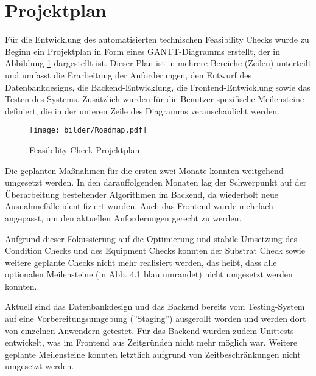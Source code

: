 \section{Projektplan}
Für die Entwicklung des automatisierten technischen Feasibility Checks wurde zu Beginn ein Projektplan in Form eines GANTT-Diagramms erstellt, der in Abbildung \ref{fig:roadmap} dargestellt ist. Dieser Plan ist in mehrere Bereiche (Zeilen) unterteilt und umfasst die Erarbeitung der Anforderungen, den Entwurf des Datenbankdesigns, die Backend-Entwicklung, die Frontend-Entwicklung sowie das Testen des Systems. Zusätzlich wurden für die Benutzer spezifische Meilensteine definiert, die in der unteren Zeile des Diagramms veranschaulicht werden.

\begin{figure}[!htbp]
    \centering
    \texttt{[image: bilder/Roadmap.pdf]}
    \caption{Feasibility Check Projektplan}
    \label{fig:roadmap}
\end{figure}

Die geplanten Maßnahmen für die ersten zwei Monate konnten weitgehend umgesetzt werden. In den darauffolgenden Monaten lag der Schwerpunkt auf der Überarbeitung bestehender Algorithmen im Backend, da wiederholt neue Ausnahmefälle identifiziert wurden. Auch das Frontend wurde mehrfach angepasst, um den aktuellen Anforderungen gerecht zu werden.

Aufgrund dieser Fokussierung auf die Optimierung und stabile Umsetzung des Condition Checks und des Equipment Checks konnten der Substrat Check sowie weitere geplante Checks nicht mehr realisiert werden, das heißt, dass alle optionalen Meilensteine (in Abb. 4.1 blau umrandet) nicht umgesetzt werden konnten.

Aktuell sind das Datenbankdesign und das Backend bereits vom Testing-System auf eine Vorbereitungsumgebung (''Staging'') ausgerollt worden und werden dort von einzelnen Anwendern getestet. Für das Backend wurden zudem Unittests entwickelt, was im Frontend aus Zeitgründen nicht mehr möglich war. Weitere geplante Meilensteine konnten letztlich aufgrund von Zeitbeschränkungen nicht umgesetzt werden.